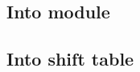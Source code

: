 \subsection{Into \wcpMod{} module}           \label{rlp utils: lookups: rlp utils into wcp}           
\subsection{Into shift table}                \label{rlp utils: lookups: rlp utils into shf table}     

